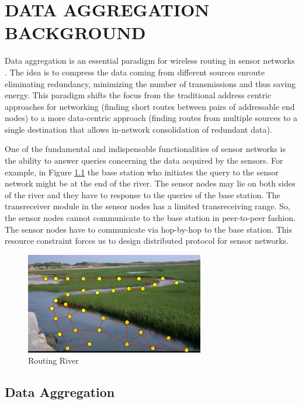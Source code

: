 \chapter{DATA AGGREGATION BACKGROUND} %
\label{cha:Data Aggregation Background}

	Data aggregation is an essential paradigm for wireless routing in sensor networks \cite{krishnamachari2002impact}. 
	The idea is to compress the data coming from different sources enroute eliminating redundancy, minimizing the number of transmissions and thus saving energy.
	This paradigm shifts the focus from the traditional address centric approaches for networking (finding short routes between pairs of addressable end nodes) to a more data-centric approach (finding routes from multiple sources to a single destination that allows in-network consolidation of redundant data).

	One of the fundamental and indispensable functionalities of sensor networks is the ability to answer queries concerning the data acquired by the sensors. 
	For example, in Figure \ref{fig:Routing River} \cite{RoutingRiver} the base station who initiates the query to the sensor network might be at the end of the river.
	The sensor nodes may lie on both sides of the river and they have to response to the queries of the base station.
	The transreceiver module in the sensor nodes has a limited transreceiving range. 
	So, the sensor nodes cannot communicate to the base station in peer-to-peer fashion.
	The sensor nodes have to communicate via hop-by-hop to the base station.
	This resource constraint forces us to design distributed protocol for sensor networks.  
	\begin{figure}[h!]
		\centering
		\includegraphics[scale = 2]{images/routing-river.jpg}
		\caption{Routing River}
		\label{fig:Routing River}
	\end{figure}

\section{Data Aggregation}

